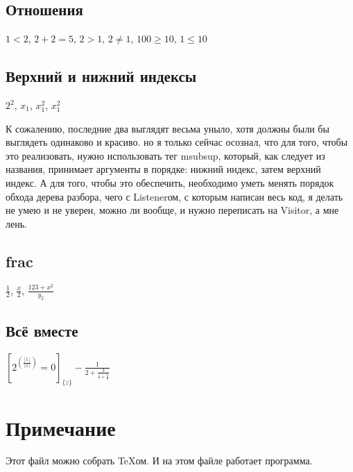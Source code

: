 \subsection{Отношения}

$1 < 2$, $2 + 2 = 5$, $2 > 1$, $2 \ne 1$, $100 \ge 10$, $1 \le 10$

\subsection{Верхний и нижний индексы}

$2^2$, $x_1$, $x_1^2$, $x^2_1$

К сожалению, последние два выглядят весьма уныло, хотя должны были бы выглядеть
одинаково и красиво. но я только сейчас осознал, что для того, чтобы это реализовать,
нужно использовать тег msubsup, который, как следует из названия, принимает
аргументы в порядке: нижний индекс, затем верхний индекс. А для того, чтобы это
обеспечить, необходимо уметь менять порядок обхода дерева разбора, чего с 
Listenerом, с которым написан весь код, я делать не умею и не уверен, можно ли
вообще, и нужно переписать на Visitor, а мне лень.

\subsection{frac}

$\frac{1}{2}$, $\frac{x}{2}$, $\frac{123 + x^2}{y_2}$

\subsection{Всё вместе}

${[2^{(\frac{\lfloor 1 \rfloor}{\lceil x \rceil})} = 0]}_{\{z\}} - 
\frac{1}{2 + \frac{3}{4 + \frac{5}{a}}}$

\section{Примечание}

Этот файл можно собрать TeXом. И на этом файле работает программа.
